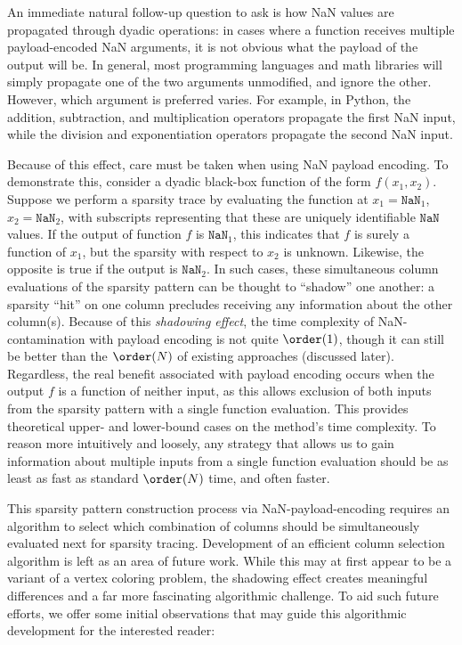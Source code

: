 \documentclass{article}
\begin{document}
An immediate natural follow-up question to ask is how NaN values are propagated through dyadic operations: in cases where a function receives multiple payload-encoded NaN arguments, it is not obvious what the payload of the output will be. In general, most programming languages and math libraries will simply propagate one of the two arguments unmodified, and ignore the other. However, which argument is preferred varies. For example, in Python, the addition, subtraction, and multiplication operators propagate the first NaN input, while the division and exponentiation operators propagate the second NaN input.

Because of this effect, care must be taken when using NaN payload encoding. To demonstrate this, consider a dyadic black-box function of the form $f(x_1, x_2)$. Suppose we perform a sparsity trace by evaluating the function at $x_1=\texttt{NaN}_1$, $x_2=\texttt{NaN}_2$, with subscripts representing that these are uniquely identifiable $\texttt{NaN}$ values. If the output of function $f$ is $\texttt{NaN}_1$, this indicates that $f$ is surely a function of $x_1$, but the sparsity with respect to $x_2$ is unknown. Likewise, the opposite is true if the output is $\texttt{NaN}_2$. In such cases, these simultaneous column evaluations of the sparsity pattern can be thought to ``shadow'' one another: a sparsity ``hit'' on one column precludes receiving any information about the other column(s). Because of this \emph{shadowing effect}, the time complexity of NaN-contamination with payload encoding is not quite $\order(1)$, though it can still be better than the $\order(N)$ of existing approaches (discussed later). Regardless, the real benefit associated with payload encoding occurs when the output $f$ is a function of neither input, as this allows exclusion of both inputs from the sparsity pattern with a single function evaluation. This provides theoretical upper- and lower-bound cases on the method's time complexity. To reason more intuitively and loosely, any strategy that allows us to gain information about multiple inputs from a single function evaluation should be as least as fast as standard $\order(N)$ time, and often faster.

This sparsity pattern construction process via NaN-payload-encoding requires an algorithm to select which combination of columns should be simultaneously evaluated next for sparsity tracing. Development of an efficient column selection algorithm is left as an area of future work. While this may at first appear to be a variant of a vertex coloring problem, the shadowing effect creates meaningful differences and a far more fascinating algorithmic challenge. To aid such future efforts, we offer some initial observations that may guide this algorithmic development for the interested reader:
\end{document}
